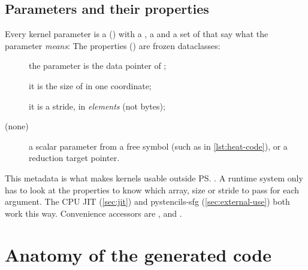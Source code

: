 \subsection{Parameters and their properties}

Every kernel parameter is a  () with a
, a  and a set of  that say what the parameter
\emph{means}:
The properties () are frozen dataclasses:
\begin{description}
  \item[] the parameter is the data pointer of ;
  \item[] it is the size of  in one
        coordinate;
  \item[] it is a stride, in \emph{elements} (not
        bytes);
  \item[(none)] a scalar parameter from a free symbol (such as  in
        \cref{lst:heat-code}), or a reduction target pointer.
\end{description}
This metadata is what makes kernels usable outside \ps. A runtime system only has to
look at the properties to know which array, size or stride to pass for each argument.
The CPU JIT (\cref{sec:jit}) and pystencils-sfg (\cref{sec:external-use}) both work this
way. Convenience accessors are ,  and
.

\section{Anatomy of the generated code}\label{sec:anatomy}

